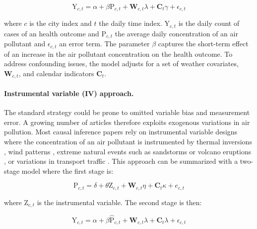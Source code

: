 \documentclass[12pt]{article}
\begin{document}
        \begin{equation*}
        \text{Y}_{c,t} = \alpha + \beta\text{P}_{c,t} + \textbf{W}_{c,t}\lambda + \textbf{C}_{t}\gamma + \epsilon_{c,t}
        \end{equation*}
        
        \noindent where $c$ is the city index and $t$ the daily time index. $\text{Y}_{c,t}$ is the daily count of cases of an health outcome and $\text{P}_{c,t}$ the average daily concentration of an air pollutant and $\epsilon_{c,t}$ an error term. The parameter $\beta$ captures the short-term effect of an increase in the air pollutant concentration on the health outcome. To address confounding issues, the model adjusts for a set of weather covariates,  $\textbf{W}_{c,t}$, and calendar indicators $\textbf{C}_{t}$. 
        
        \paragraph{Instrumental variable (IV) approach.} The standard strategy could be prone to omitted variable bias and measurement error. A growing number of articles therefore exploits exogenous variations in air pollution. Most causal inference papers rely on instrumental variable designs where the concentration of an air pollutant is instrumented by thermal inversions \citep{arceo_does_2016}, wind patterns \citep{schwartz_national_2018, deryugina_mortality_2019}, extreme natural events such as sandstorms or volcano eruptions \citep{ebenstein_particulate_2015, halliday_vog_2019}, or variations in transport traffic \citep{moretti_pollution_2011, knittel_caution_2016, schlenker_airports_2016}. This approach can be summarized with a two-stage model where the first stage is:
        
        \begin{equation*}
        \text{P}_{c,t} = \delta + \theta\text{Z}_{c,t} + \textbf{W}_{c,t}\eta + \textbf{C}_{t}\kappa + e_{c,t}
        \end{equation*}
        
        \noindent where $\text{Z}_{c,t}$ is the instrumental variable. The second stage is then:
        
        \begin{equation*}
        \text{Y}_{c,t} = \alpha + \beta\widehat{\text{P}}_{c,t} + \textbf{W}_{c,t}\lambda + \textbf{C}_{t}\lambda + \epsilon_{c,t}
        \end{equation*}
        
\end{document}
